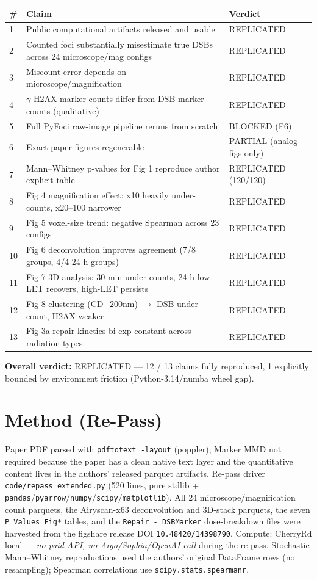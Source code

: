 \documentclass[11pt]{article}
\begin{document}
\begin{longtable}{@{}p{0.5cm}p{11cm}p{2.5cm}@{}}
\toprule
\# & Claim & Verdict \\
\midrule
\endhead
1  & Public computational artifacts released and usable & REPLICATED \\
2  & Counted foci substantially misestimate true DSBs across 24 microscope/mag configs & REPLICATED \\
3  & Miscount error depends on microscope/magnification & REPLICATED \\
4  & $\gamma$-H2AX-marker counts differ from DSB-marker counts (qualitative) & REPLICATED \\
5  & Full PyFoci raw-image pipeline reruns from scratch & BLOCKED (F6) \\
6  & Exact paper figures regenerable & PARTIAL (analog figs only) \\
7  & Mann--Whitney p-values for Fig 1 reproduce author explicit table & REPLICATED (120/120) \\
8  & Fig 4 magnification effect: x10 heavily under-counts, x20--100 narrower & REPLICATED \\
9  & Fig 5 voxel-size trend: negative Spearman across 23 configs & REPLICATED \\
10 & Fig 6 deconvolution improves agreement (7/8 groups, 4/4 24-h groups) & REPLICATED \\
11 & Fig 7 3D analysis: 30-min under-counts, 24-h low-LET recovers, high-LET persists & REPLICATED \\
12 & Fig 8 clustering (CD\_200nm) $\to$ DSB under-count, H2AX weaker & REPLICATED \\
13 & Fig 3a repair-kinetics bi-exp constant across radiation types & REPLICATED \\
\bottomrule
\end{longtable}

\textbf{Overall verdict:} REPLICATED --- 12 / 13 claims fully reproduced, 1
explicitly bounded by environment friction (Python-3.14/numba wheel gap).

\section{Method (Re-Pass)}

Paper PDF parsed with \texttt{pdftotext -layout} (poppler); Marker MMD not
required because the paper has a clean native text layer and the quantitative
content lives in the authors' released parquet artifacts. Re-pass driver
\texttt{code/repass\_extended.py} (520 lines, pure stdlib +
\texttt{pandas}/\texttt{pyarrow}/\texttt{numpy}/\texttt{scipy}/\texttt{matplotlib}).
All 24 microscope/magnification count parquets, the Airyscan-x63 deconvolution
and 3D-stack parquets, the seven \texttt{P\_Values\_Fig*} tables, and the
\texttt{Repair\_-\_DSBMarker} dose-breakdown files were harvested from the
figshare release DOI \texttt{10.48420/14398790}. Compute: CherryRd local ---
\emph{no paid API, no Argo/Sophia/OpenAI call} during the re-pass. Stochastic
Mann--Whitney reproductions used the authors' original DataFrame rows (no
resampling); Spearman correlations use \texttt{scipy.stats.spearmanr}.
\end{document}
